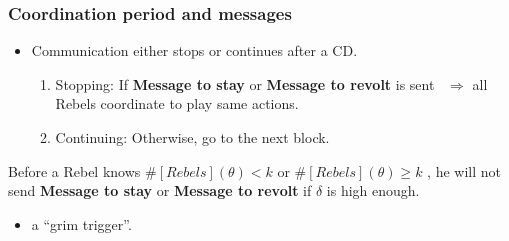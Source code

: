 \documentclass[9pt]{beamer}
\begin{document}
\begin{frame}[label=protocol_grim_trigger]
\frametitle{Coordination period and messages}



\begin{itemize}
\item Communication either stops or continues after a CD.
\begin{enumerate}
\item {Stopping}: If \textbf{Message to stay} or \textbf{Message to revolt} is sent \ $\Rightarrow$ all Rebels coordinate to play same actions. 
\item {Continuing}: Otherwise, go to the next block.
\end{enumerate}

\end{itemize}

\pause
\begin{lemma}
Before a Rebel knows $\#[Rebels](\theta)< k$ or $\#[Rebels](\theta)\geq k$ , he will not send \textbf{Message to stay} or \textbf{Message to revolt} if $\delta$ is high enough.
\end{lemma}
\begin{itemize}
\item a ``grim trigger''.
\end{itemize}
\hyperlink{CD_to_RP}{}
\end{frame}
\end{document}
